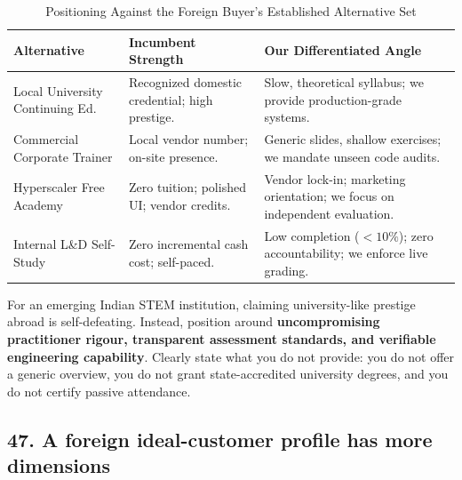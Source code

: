 \begin{table}[htbp]
\centering
\small
\caption{Positioning Against the Foreign Buyer's Established Alternative Set}
\label{tab:positioning_alternatives}
\begin{tabularx}{\columnwidth}{p{2.2cm} p{2.4cm} X}
\toprule
\textbf{Alternative} & \textbf{Incumbent Strength} & \textbf{Our Differentiated Angle} \\
\midrule
Local University Continuing Ed. & Recognized domestic credential; high prestige. & Slow, theoretical syllabus; we provide production-grade systems. \\
Commercial Corporate Trainer & Local vendor number; on-site presence. & Generic slides, shallow exercises; we mandate unseen code audits. \\
Hyperscaler Free Academy & Zero tuition; polished UI; vendor credits. & Vendor lock-in; marketing orientation; we focus on independent evaluation. \\
Internal L\&D Self-Study & Zero incremental cash cost; self-paced. & Low completion ($<10\%$); zero accountability; we enforce live grading. \\
\bottomrule
\end{tabularx}
\end{table}

For an emerging Indian STEM institution, claiming university-like prestige abroad is self-defeating. Instead, position around \textbf{uncompromising practitioner rigour, transparent assessment standards, and verifiable engineering capability}. Clearly state what you do not provide: you do not offer a generic overview, you do not grant state-accredited university degrees, and you do not certify passive attendance.

\subsection{47. A foreign ideal-customer profile has more dimensions}

